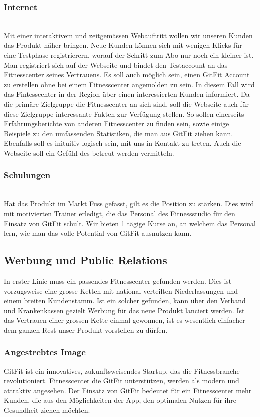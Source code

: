 \subsubsection{Internet} \hfill \\
Mit einer interaktivem und zeitgemässen Webauftritt wollen wir unseren Kunden das Produkt näher bringen. Neue Kunden können sich mit wenigen Klicks für eine Testphase registrierern, worauf der Schritt zum Abo nur noch ein kleiner ist. Man registriert sich auf der Webseite und bindet den Testaccount an das Fitnesscenter seines Vertrauens. Es soll auch möglich sein, einen GitFit Account zu erstellen ohne bei einem Fitnesscenter angemolden zu sein. In diesem Fall wird das Fintesscenter in der Region über einen interessierten Kunden informiert. Da die primäre Zielgruppe die Fitnesscenter an sich sind, soll die Webseite auch für diese Zielgruppe interessante Fakten zur Verfügung stellen. So sollen einerseits Erfahrungsberichte von anderen Fitnesscenter zu finden sein, sowie einige Beispiele zu den umfassenden Statistiken, die man aus GitFit ziehen kann. Ebenfalls soll es inituitiv logisch sein, mit uns in Kontakt zu treten. Auch die Webseite soll ein Gefühl des betreut werden vermitteln.

\subsubsection{Schulungen} \hfill \\
Hat das Produkt im Markt Fuss gefasst, gilt es die Position zu stärken. Dies wird mit motivierten Trainer erledigt, die das Personal des Fitnessstudio für den Einsatz von GitFit schult. Wir bieten 1 tägige Kurse an, an welchem das Personal lern, wie man das volle Potential von GitFit ausnutzen kann.

\subsection{Werbung und Public Relations}
In erster Linie muss ein passendes Fitnesscenter gefunden werden. Dies ist vorzugsweise eine grosse Ketten mit national verteilten Niederlassungen und einem breiten Kundenstamm. Ist ein solcher gefunden, kann über den Verband und Krankenkassen gezielt Werbung für das neue Produkt lanciert werden. Ist das Vertrauen einer grossen Kette einmal gewonnen, ist es wesentlich einfacher dem ganzen Rest unser Produkt vorstellen zu dürfen.

\subsubsection{Angestrebtes Image}
GitFit ist ein innovatives, zukunftsweisendes Startup, das die Fitnessbranche revolutioniert. Fitnesscenter die GitFit unterstützen, werden als modern und attraktiv angesehen. Der Einsatz von GitFit bedeutet für ein Fitnesscenter mehr Kunden, die aus den Möglichkeiten der App, den optimalen Nutzen für ihre Gesundheit ziehen möchten.

